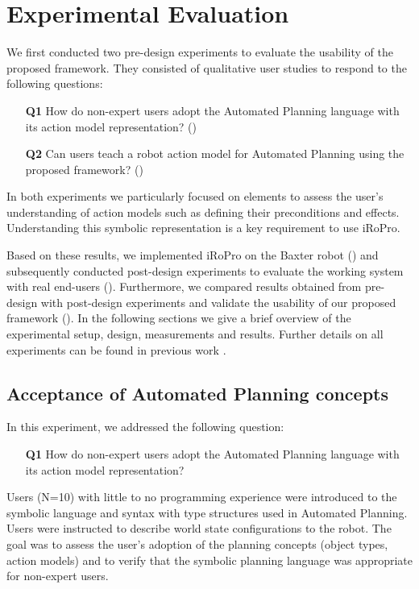 \section{Experimental Evaluation}\label{sec:exp-eval}
We first conducted two pre-design experiments to evaluate the usability of the proposed framework.
They consisted of qualitative user studies to respond to the following questions:
\begin{enumerate}
	\item[\textbf{Q1}] How do non-expert users adopt the Automated Planning language with its action model representation? ()
	\item[\textbf{Q2}] Can users teach a robot action model for Automated Planning using the proposed framework? ()
\end{enumerate}

In both experiments we particularly focused on elements to assess the user's understanding of action models such as defining their preconditions and effects.
Understanding this symbolic representation is a key requirement to use iRoPro.

Based on these results, we implemented iRoPro on the Baxter robot () and subsequently conducted post-design experiments to evaluate the working system with real end-users ().
Furthermore, we compared results obtained from pre-design with post-design experiments and validate the usability of our proposed framework ().
In the following sections we give a brief overview of the experimental setup, design, measurements and results.
Further details on all experiments can be found in previous work \cite{liang2017b,liang2019d}.


\subsection{Acceptance of Automated Planning concepts}\label{sec:Exp1}
In this experiment, we addressed the following question:
\begin{enumerate}
	\item[\textbf{Q1}] How do non-expert users adopt the Automated Planning language with its action model representation?
\end{enumerate}

Users (N=10) with little to no programming experience were introduced to the symbolic language and syntax with type structures used in Automated Planning.
Users were instructed to describe world state configurations to the robot.
The goal was to assess the user's adoption of the planning concepts (\eg object types, action models) and to verify that the symbolic planning language was appropriate for non-expert users.

